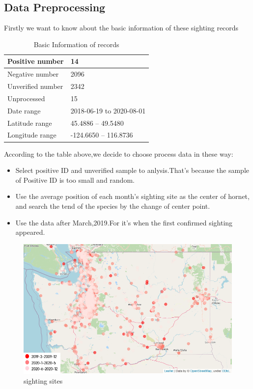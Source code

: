 \documentclass[12pt]{article}
\begin{document}
\subsection{Data Preprocessing}
Firstly we want to know about the basic information of these sighting records
\begin{table}[H]
	\caption{Basic Information of records}  
	\large
	\begin{center}  
		\begin{tabular}{|p{7cm}|p{7cm}|}  
			\hline  
			Positive number & 14  \\ \hline  
			Negative number& 2096\\ \hline  
			Unverified number &2342 \\  
			\hline 
			Unprocessed & 15 \\  
			\hline  
			Date range &2018-06-19   to   2020-08-01 \\  
			\hline
		    Latitude range & 45.4886  --   49.5480\\  
			\hline
			Longitude range & -124.6650   --  116.8736\\  
			\hline
		\end{tabular}  
	\end{center}  
\end{table}

According to the table above,we decide to choose process data in these way:
\begin{itemize}
	\item Select positive ID and unverified sample to anlysis.That's because the sample of Positive ID is too small and  random.
	\item Use the average position of each month's sighting site as the center of hornet, and search the tend of the species by the change of center point.
	\item Use the data after March,2019.For it's when the first confirmed sighting appeared.
\end{itemize}

\begin{figure}[H]
	\centering
	\includegraphics[width=14cm,height=7cm]{./pictures/distribute1.png}
	\caption{sighting sites}\label{nt}
\end{figure}
\end{document}

